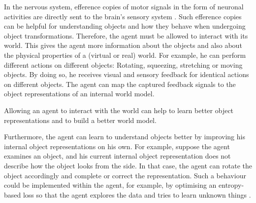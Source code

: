 In the nervous system, efference copies of motor signals in the form of neuronal activities are directly sent to the brain’s sensory system .
Such efference copies can be helpful for understanding objects and how they behave when undergoing object transformations.
Therefore, the agent must be allowed to interact with its world.
This gives the agent more information about the objects and also about the physical properties of a (virtual or real) world. For example, he can perform different actions on different objects: Rotating, squeezing, stretching or moving objects. By doing so, he receives visual and sensory feedback for identical actions on different objects.
The agent can map the captured feedback signals to the object representations of an internal world model.

\begin{claim}
	Allowing an agent to interact with the world can help to learn better object representations and to build a better world model.
\end{claim}

Furthermore, the agent can learn to understand objects better by improving his internal object representations on his own. For example, suppose the agent examines an object, and his current internal object representation does not describe how the object looks from the side. In that case, the agent can rotate the object accordingly and complete or correct the representation. 
Such a behaviour could be implemented within the agent, for example, by optimising an entropy-based loss so that the agent explores the data and tries to learn unknown things .